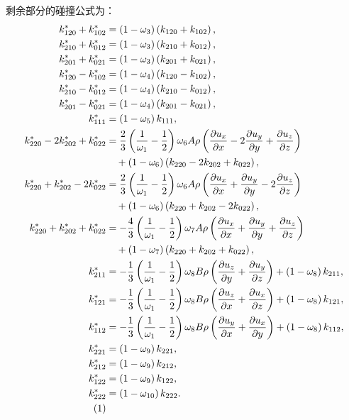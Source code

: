 剩余部分的碰撞公式为：
\begin{align*}
k_{120}^{*}+k_{102}^{*} & =\left(1-\omega_{3}\right)\left(k_{120}+k_{102}\right), \\
k_{210}^{*}+k_{012}^{*} & =\left(1-\omega_{3}\right)\left(k_{210}+k_{012}\right), \\
k_{201}^{*}+k_{021}^{*} & =\left(1-\omega_{3}\right)\left(k_{201}+k_{021}\right), \\
k_{120}^{*}-k_{102}^{*} & =\left(1-\omega_{4}\right)\left(k_{120}-k_{102}\right), \\
k_{210}^{*}-k_{012}^{*} & =\left(1-\omega_{4}\right)\left(k_{210}-k_{012}\right), \\
k_{201}^{*}-k_{021}^{*} & =\left(1-\omega_{4}\right)\left(k_{201}-k_{021}\right), \\
k_{111}^{*} & =\left(1-\omega_{5}\right) k_{111}, \\
k_{220}^{*}-2 k_{202}^{*}+k_{022}^{*} & =\frac{2}{3}\left(\frac{1}{\omega_{1}}-\frac{1}{2}\right) \omega_{6} A \rho\left(\frac{\partial u_x}{\partial x}-2 \frac{\partial u_y}{\partial y}+\frac{\partial u_z}{\partial z}\right) \\
&\quad +\left(1-\omega_{6}\right)\left(k_{220}-2 k_{202}+k_{022}\right), \\
k_{220}^{*}+k_{202}^{*}-2 k_{022}^{*} & =\frac{2}{3}\left(\frac{1}{\omega_{1}}-\frac{1}{2}\right) \omega_{6} A \rho\left(\frac{\partial u_x}{\partial x}+\frac{\partial u_y}{\partial y}-2 \frac{\partial u_z}{\partial z}\right) \\
&\quad +\left(1-\omega_{6}\right)\left(k_{220}+k_{202}-2 k_{022}\right), \\
k_{220}^{*}+k_{202}^{*}+k_{022}^{*} & =-\frac{4}{3}\left(\frac{1}{\omega_{1}}-\frac{1}{2}\right) \omega_{7} A \rho\left(\frac{\partial u_x}{\partial x}+\frac{\partial u_y}{\partial y}+\frac{\partial u_z}{\partial z}\right) \\
&\quad +\left(1-\omega_{7}\right)\left(k_{220}+k_{202}+k_{022}\right), \\
k_{211}^{*} & =-\frac{1}{3}\left(\frac{1}{\omega_{1}}-\frac{1}{2}\right) \omega_{8} B \rho\left(\frac{\partial u_z}{\partial y}+\frac{\partial u_y}{\partial z}\right)+\left(1-\omega_{8}\right) k_{211}, \\
k_{121}^{*} & =-\frac{1}{3}\left(\frac{1}{\omega_{1}}-\frac{1}{2}\right) \omega_{8} B \rho\left(\frac{\partial u_z}{\partial x}+\frac{\partial u_x}{\partial z}\right)+\left(1-\omega_{8}\right) k_{121}, \\
k_{112}^{*} & =-\frac{1}{3}\left(\frac{1}{\omega_{1}}-\frac{1}{2}\right) \omega_{8} B \rho\left(\frac{\partial u_y}{\partial x}+\frac{\partial u_x}{\partial y}\right)+\left(1-\omega_{8}\right) k_{112}, \\
k_{221}^{*} & =\left(1-\omega_{9}\right) k_{221}, \\
k_{212}^{*} & =\left(1-\omega_{9}\right) k_{212}, \\
k_{122}^{*} & =\left(1-\omega_{9}\right) k_{122}, \\
k_{222}^{*} & =\left(1-\omega_{10}\right) k_{222} . \\
\stepcounter{equation}\tag{\theequation}
\end{align*}
